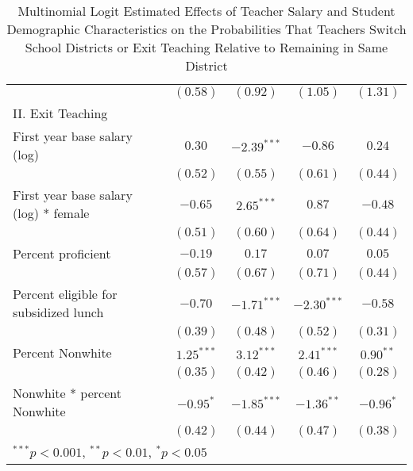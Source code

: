 \documentclass[12pt,]{article}
\begin{document}
\begin{table}
\begin{center}
\begin{tabular}{l c c c c }
                                                & $(0.58)$      & $(0.92)$      & $(1.05)$      & $(1.31)$     \\
II. Exit Teaching                               &               &               &               &              \\
\quad First year base salary (log)           & $0.30$        & $-2.39^{***}$ & $-0.86$       & $0.24$       \\
                                                & $(0.52)$      & $(0.55)$      & $(0.61)$      & $(0.44)$     \\
\quad First year base salary (log) * female  & $-0.65$       & $2.65^{***}$  & $0.87$        & $-0.48$      \\
                                                & $(0.51)$      & $(0.60)$      & $(0.64)$      & $(0.44)$     \\
\quad Percent proficient                     & $-0.19$       & $0.17$        & $0.07$        & $0.05$       \\
                                                & $(0.57)$      & $(0.67)$      & $(0.71)$      & $(0.44)$     \\
\quad Percent eligible for subsidized lunch  & $-0.70$       & $-1.71^{***}$ & $-2.30^{***}$ & $-0.58$      \\
                                                & $(0.39)$      & $(0.48)$      & $(0.52)$      & $(0.31)$     \\
\quad Percent Nonwhite                       & $1.25^{***}$  & $3.12^{***}$  & $2.41^{***}$  & $0.90^{**}$  \\
                                                & $(0.35)$      & $(0.42)$      & $(0.46)$      & $(0.28)$     \\
\quad Nonwhite * percent Nonwhite            & $-0.95^{*}$   & $-1.85^{***}$ & $-1.36^{**}$  & $-0.96^{*}$  \\
                                                & $(0.42)$      & $(0.44)$      & $(0.47)$      & $(0.38)$     \\
\hline
\multicolumn{5}{l}{\scriptsize{$^{***}p<0.001$, $^{**}p<0.01$, $^*p<0.05$}}
\end{tabular}
\caption{Multinomial Logit Estimated Effects of Teacher Salary and Student Demographic Characteristics on the Probabilities That Teachers Switch School Districts or Exit Teaching Relative to Remaining in Same District}
\label{tbl:reg_mlogit}
\end{center}
\end{table}
\end{document}
